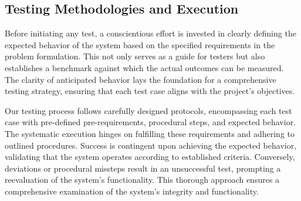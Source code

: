 \documentclass[../report.tex]{subfiles}
\begin{document}
    \subsection{Testing Methodologies and Execution}
    Before initiating any test, a conscientious effort is invested in clearly
    defining the expected behavior of the system based on the specified
    requirements in the problem formulation. This not only serves as a guide for testers but also
    establishes a benchmark against which the actual outcomes can be measured.
    The clarity of anticipated behavior lays the foundation for a comprehensive
    testing strategy, ensuring that each test case aligns with the project's
    objectives.

    Our testing process follows carefully designed protocols, encompassing each
    test case with pre-defined pre-requirements, procedural steps, and expected
    behavior. The systematic execution hinges on fulfilling these requirements
    and adhering to outlined procedures. Success is contingent upon achieving
    the expected behavior, validating that the system operates according to
    established criteria. Conversely, deviations or procedural missteps result
    in an unsuccessful test, prompting a reevaluation of the system's
    functionality. This thorough approach ensures a comprehensive examination
    of the system's integrity and functionality.
\end{document}
